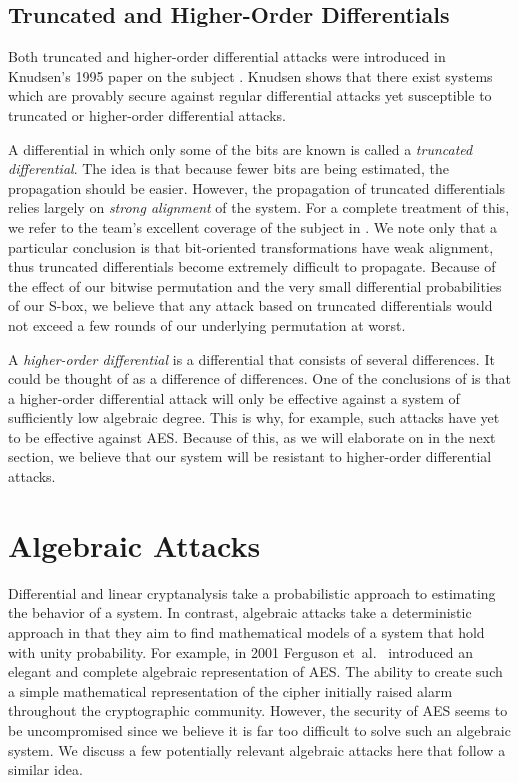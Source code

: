 \subsection{Truncated and Higher-Order Differentials}
Both truncated and higher-order differential attacks were introduced in Knudsen's 1995 paper on the subject \cite{Knudsen1995_Truncated}.
Knudsen shows that there exist systems which are provably secure against regular differential attacks yet susceptible to truncated or higher-order differential attacks.

A differential in which only some of the bits are known is called a \emph{truncated differential}.
The idea is that because fewer bits are being estimated, the propagation should be easier. 
However, the propagation of truncated differentials relies largely on \emph{strong alignment} of the system.
For a complete treatment of this, we refer to the \Keccak team's excellent coverage of the subject in \cite{Bertoni2011_Alignment}.
We note only that a particular conclusion is that bit-oriented transformations have weak alignment, thus truncated differentials become extremely difficult to propagate.
Because of the effect of our bitwise permutation and the very small differential probabilities of our S-box, we believe that any attack based on truncated differentials would not exceed a few rounds of our underlying permutation at worst.

A \emph{higher-order differential} is a differential that consists of several differences.
It could be thought of as a difference of differences.
One of the conclusions of \cite{Knudsen1995_Truncated} is that a higher-order differential attack will only be effective against a system of sufficiently low algebraic degree.
This is why, for example, such attacks have yet to be effective against AES.
Because of this, as we will elaborate on in the next section, we believe that our system will be resistant to higher-order differential attacks.

\section{Algebraic Attacks}
Differential and linear cryptanalysis take a probabilistic approach to estimating the behavior of a system.
In contrast, algebraic attacks take a deterministic approach in that they aim to find mathematical models of a system that hold with unity probability.
For example, in 2001 Ferguson et~al.\ \cite{Ferguson2001_AlgebraicRijndael} introduced an elegant and complete algebraic representation of AES.
The ability to create such a simple mathematical representation of the cipher initially raised alarm throughout the cryptographic community.
However, the security of AES seems to be uncompromised since we believe it is far too difficult to solve such an algebraic system.
We discuss a few potentially relevant algebraic attacks here that follow a similar idea.

